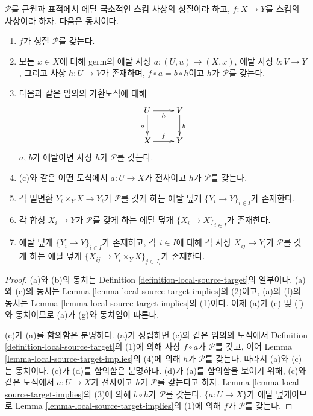 \begin{lemma}
\label{lemma-local-source-target-characterize}
$\mathcal{P}$를 근원과 표적에서 에탈 국소적인 스킴 사상의 성질이라
하고, $f : X \to Y$를 스킴의 사상이라 하자. 다음은 동치이다.
\begin{enumerate}
\item[(a)] $f$가 성질 $\mathcal{P}$를 갖는다.
\item[(b)] 모든 $x \in X$에 대해 germ의 에탈 사상
$a : (U, u) \to (X, x)$, 에탈 사상 $b : V \to Y$, 그리고
사상 $h : U \to V$가 존재하며, $f \circ a = b \circ h$이고
$h$가 $\mathcal{P}$를 갖는다.
\item[(c)] 다음과 같은 임의의 가환도식에 대해
$$
\xymatrix{
U \ar[d]_a \ar[r]_h & V \ar[d]^b \\
X \ar[r]^f & Y
}
$$
$a$, $b$가 에탈이면 사상 $h$가 $\mathcal{P}$를 갖는다.
\item[(d)] (c)와 같은 어떤 도식에서 $a : U \to X$가 전사이고
$h$가 $\mathcal{P}$를 갖는다.
\item[(e)] 각 밑변환 $Y_i \times_Y X \to Y_i$가 $\mathcal{P}$를
갖게 하는 에탈 덮개 $\{Y_i \to Y\}_{i \in I}$가 존재한다.
\item[(f)] 각 합성 $X_i \to Y$가 $\mathcal{P}$를 갖게 하는 에탈
덮개 $\{X_i \to X\}_{i \in I}$가 존재한다.
\item[(g)] 에탈 덮개 $\{Y_i \to Y\}_{i \in I}$가 존재하고, 각
$i \in I$에 대해 각 사상 $X_{ij} \to Y_i$가 $\mathcal{P}$를 갖게
하는 에탈 덮개
$\{X_{ij} \to Y_i \times_Y X\}_{j \in J_i}$가 존재한다.
\end{enumerate}
\end{lemma}

\begin{proof}
(a)와 (b)의 동치는 Definition \ref{definition-local-source-target}의
일부이다. (a)와 (e)의 동치는 Lemma
\ref{lemma-local-source-target-implies}의 (2)이고, (a)와 (f)의 동치는
Lemma \ref{lemma-local-source-target-implies}의 (1)이다. 이제 (a)가
(e) 및 (f)와 동치이므로
(a)가 (g)와 동치임이 따른다.

\medskip\noindent
(c)가 (a)를 함의함은 분명하다. (a)가 성립하면 (c)와 같은 임의의
도식에서 Definition \ref{definition-local-source-target}의 (1)에 의해
사상 $f \circ a$가 $\mathcal{P}$를 갖고, 이어 Lemma
\ref{lemma-local-source-target-implies}의 (4)에 의해 $h$가
$\mathcal{P}$를 갖는다. 따라서 (a)와 (c)는 동치이다. (c)가 (d)를
함의함은 분명하다. (d)가 (a)를 함의함을 보이기 위해, (c)와 같은
도식에서 $a : U \to X$가 전사이고 $h$가 $\mathcal{P}$를 갖는다고
하자. Lemma \ref{lemma-local-source-target-implies}의 (3)에 의해
$b \circ h$가 $\mathcal{P}$를 갖는다. $\{a : U \to X\}$가 에탈
덮개이므로 Lemma \ref{lemma-local-source-target-implies}의 (1)에 의해
$f$가 $\mathcal{P}$를 갖는다.
\end{proof}

